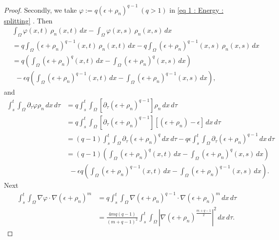 \documentclass{amsart}
\numberwithin{equation}{section}
\begin{document}
\begin{proof}
Secondly, we take $\varphi :=q (\epsilon+\rho_n)^{q-1}~(q>1)$  in \eqref{eq 1 : Energy : splitting} . Then
\begin{equation}\label{eq 6 : Energy : splitting}
\begin{aligned}
&\int_{\Omega}\varphi(x,t) ~\rho_n(x,t)\,dx - \int_{\Omega}\varphi(x,s) ~\rho_n(x,s)\,dx\\
  &=  q\int_{\Omega}(\epsilon+ \rho_n)^{q-1}(x,t) ~\rho_n(x,t)\,dx - q\int_{\Omega}(\epsilon+ \rho_n)^{q-1}(x,s) ~\rho_n(x,s)\,dx\\
  &=q \left ( \int_\Omega (\epsilon+ \rho_n)^{q}(x,t) \,dx- \int_\Omega (\epsilon + \rho_n)^{q}(x,s) \,dx\right ) \\
& ~~- \epsilon q \left ( \int_\Omega (\epsilon + \rho_n)^{q-1}(x,t) \,dx- \int_\Omega (\epsilon + \rho_n)^{q-1}(x,s) \,dx\right ),
\end{aligned}
\end{equation}
and
\begin{equation}\label{eq 3 : Energy : splitting}
\begin{aligned}
\int_s^t \int_\Omega \partial_\tau \varphi \rho_n \,dx\,d\tau &=q\int_s^t \int_\Omega [\partial_\tau (\epsilon+\rho_n)^{q-1}] \rho_n \,dx\,d\tau\\
&=q\int_s^t \int_\Omega [\partial_\tau (\epsilon+\rho_n)^{q-1}][ (\epsilon+\rho_n ) -\epsilon ]\,dx\,d\tau\\
&=(q-1) \int_s^t \int_\Omega\partial_\tau\left(\epsilon+ \rho_n \right)^{q}  \,dx\,d\tau -q\epsilon \int_s^t \int_\Omega \partial_\tau\left(\epsilon+ \rho_n \right)^{q-1}  \,dx\,d\tau \\
&=(q-1) \left ( \int_\Omega (\epsilon+ \rho_n)^{q}(x,t) \,dx- \int_\Omega (\epsilon + \rho_n)^{q}(x,s) \,dx\right ) \\
& ~~- \epsilon q\left ( \int_\Omega (\epsilon + \rho_n)^{q-1}(x,t) \,dx- \int_\Omega (\epsilon + \rho_n)^{q-1}(x,s) \,dx\right ).
\end{aligned}
\end{equation}
Next
\begin{equation}\label{eq 4 : Energy : splitting}
\begin{aligned}
\int_s^t \int_\Omega\nabla \varphi \cdot\nabla (\epsilon+\rho_n)^m &= q\int_s^t \int_\Omega \nabla(\epsilon + \rho_n)^{q-1} \cdot \nabla (\epsilon+\rho_n)^m \,dx \,d\tau \\
&=\frac{4mq(q-1)}{(m+q-1)^2}\int_s^t \int_\Omega  \left | \nabla (\epsilon+\rho_n)^{\frac{m+q-1}{2}} \right |^2 \,dx\,d\tau.
\end{aligned}

\end{equation}
\end{proof}
\end{document}
